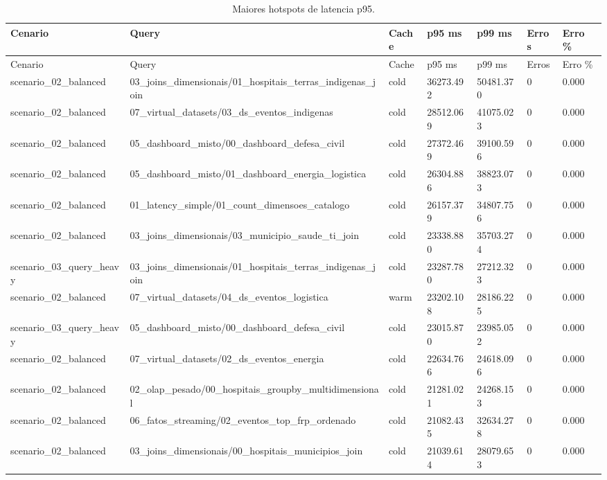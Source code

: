{
\scriptsize
\setlength{\tabcolsep}{4pt}
\renewcommand{\arraystretch}{1.15}
\begin{longtable}{p{}p{}p{}p{}p{}p{}p{}}
\caption{Maiores hotspots de latencia p95.}\\
\toprule
Cenario & Query & Cache & p95 ms & p99 ms & Erros & Erro \% \\
\midrule
\endfirsthead
\toprule
Cenario & Query & Cache & p95 ms & p99 ms & Erros & Erro \% \\
\midrule
\endhead
scenario\_02\_balanced & 03\_joins\_dimensionais/01\_hospitais\_terras\_indigenas\_join & cold & 36273.492 & 50481.370 & 0 & 0.000 \\
scenario\_02\_balanced & 07\_virtual\_datasets/03\_ds\_eventos\_indigenas & cold & 28512.069 & 41075.023 & 0 & 0.000 \\
scenario\_02\_balanced & 05\_dashboard\_misto/00\_dashboard\_defesa\_civil & cold & 27372.469 & 39100.596 & 0 & 0.000 \\
scenario\_02\_balanced & 05\_dashboard\_misto/01\_dashboard\_energia\_logistica & cold & 26304.886 & 38823.073 & 0 & 0.000 \\
scenario\_02\_balanced & 01\_latency\_simple/01\_count\_dimensoes\_catalogo & cold & 26157.379 & 34807.756 & 0 & 0.000 \\
scenario\_02\_balanced & 03\_joins\_dimensionais/03\_municipio\_saude\_ti\_join & cold & 23338.880 & 35703.274 & 0 & 0.000 \\
scenario\_03\_query\_heavy & 03\_joins\_dimensionais/01\_hospitais\_terras\_indigenas\_join & cold & 23287.780 & 27212.323 & 0 & 0.000 \\
scenario\_02\_balanced & 07\_virtual\_datasets/04\_ds\_eventos\_logistica & warm & 23202.108 & 28186.225 & 0 & 0.000 \\
scenario\_03\_query\_heavy & 05\_dashboard\_misto/00\_dashboard\_defesa\_civil & cold & 23015.870 & 23985.052 & 0 & 0.000 \\
scenario\_02\_balanced & 07\_virtual\_datasets/02\_ds\_eventos\_energia & cold & 22634.766 & 24618.096 & 0 & 0.000 \\
scenario\_02\_balanced & 02\_olap\_pesado/00\_hospitais\_groupby\_multidimensional & cold & 21281.021 & 24268.153 & 0 & 0.000 \\
scenario\_02\_balanced & 06\_fatos\_streaming/02\_eventos\_top\_frp\_ordenado & cold & 21082.435 & 32634.278 & 0 & 0.000 \\
scenario\_02\_balanced & 03\_joins\_dimensionais/00\_hospitais\_municipios\_join & cold & 21039.614 & 28079.653 & 0 & 0.000 \\

\end{longtable}}
